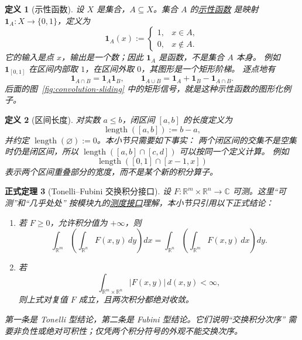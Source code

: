 \documentclass[UTF8,fontset=none,a4paper,11pt]{ctexart}
\theoremstyle{foundation-definition}
\newtheorem{definition}{定义}[section]
\theoremstyle{foundation-theorem}
\newtheorem{theorem}[definition]{正式定理}
\theoremstyle{foundation-proposition}
\theoremstyle{foundation-example}
\theoremstyle{foundation-remark}
\theoremstyle{foundation-theorem}
\newcommand{\term}[2]{\hyperref[#1]{#2}}
\begin{document}
\begin{definition}[示性函数]\label{def:indicator-function}
设 \(X\) 是集合，\(A\subseteq X\)。集合 \(A\) 的\term{def:indicator-function}{示性函数}
是映射 \(\mathbf 1_A:X\to\{0,1\}\)，定义为
\[
\mathbf 1_A(x):=
\begin{cases}
1,&x\in A,\\
0,&x\notin A.
\end{cases}
\]
它的输入是点 \(x\)，输出是一个数；因此 \(\mathbf 1_A\) 是函数，不是集合 \(A\) 本身。
例如 \(\mathbf 1_{[0,1]}\) 在区间内部取 \(1\)，在区间外取 \(0\)，其图形是一个矩形阶梯。
逐点地有
\[
\mathbf 1_{A\cap B}=\mathbf 1_A\mathbf 1_B,\qquad
\mathbf 1_{A\cup B}=\mathbf 1_A+\mathbf 1_B-\mathbf 1_{A\cap B}.
\]
后面的图~\ref{fig:convolution-sliding} 中的矩形信号，就是这种示性函数的图形化例子。
\end{definition}

\begin{definition}[区间长度]\label{def:interval-length}
对实数 \(a\leq b\)，闭区间 \([a,b]\) 的长度定义为
\[
\operatorname{length}([a,b]):=b-a,
\]
并约定 \(\operatorname{length}(\varnothing):=0\)。本小节只需要如下事实：
两个闭区间的交集不是空集时仍是闭区间，所以
\(\operatorname{length}([a,b]\cap[c,d])\) 可以按同一个定义计算。
例如
\[
\operatorname{length}([0,1]\cap[x-1,x])
\]
表示两个区间重叠部分的宽度，而不是某个新的积分算子。
\end{definition}

\begin{theorem}[Tonelli--Fubini 交换积分接口]\label{thm:tonelli-fubini-interface}
设 \(F:\mathbb R^m\times\mathbb R^n\to\mathbb C\) 可测。这里“可测”和“几乎处处”
按模块九的\term{def:measurable}{测度接口}理解，本小节只引用以下正式结论：
\begin{enumerate}[label=(\roman*),leftmargin=2.5em]
  \item 若 \(F\geq0\)，允许积分值为 \(+\infty\)，则
  \[
  \int_{\mathbb R^m}\!\left(\int_{\mathbb R^n}F(x,y)\,dy\right)dx
  =
  \int_{\mathbb R^n}\!\left(\int_{\mathbb R^m}F(x,y)\,dx\right)dy.
  \]
  \item 若
  \[
  \int_{\mathbb R^m\times\mathbb R^n}|F(x,y)|\,d(x,y)<\infty,
  \]
  则上式对复值 \(F\) 成立，且两次积分都绝对收敛。
\end{enumerate}
第一条是 Tonelli 型结论，第二条是 Fubini 型结论。它们说明“交换积分次序”
需要非负性或绝对可积性；仅凭两个积分符号的外观不能交换次序。
\end{theorem}
\end{document}
